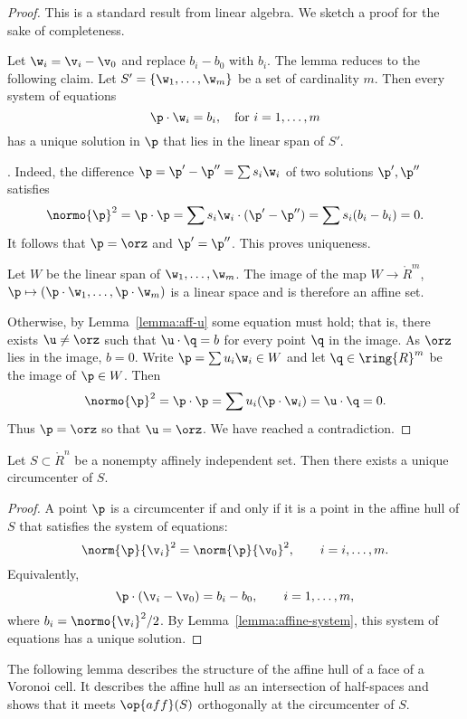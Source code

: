 \begin{proof} This is a standard result from linear algebra.
We sketch a proof for the sake of completeness.  

Let $\w_i = \v_i-\v_0$ and replace $b_i-b_0$ with $b_i$.  
The lemma reduces to the following claim.
Let $S' = \{\w_1,\ldots,\w_m\}$ be a  set
of cardinality $m$.  Then every system of equations
\[  
\p \cdot \w_i = b_i,\quad \text{for }i=1,\ldots,m
\] 
has a unique solution in $\p$ that lies in the linear span of $S'$.

. Indeed, the difference 
$\p = \p'-\p'' = \sum s_i \w_i$ of two solutions
$\p',\p''$ satisfies
\[  
\normo{\p}^2=\p\cdot\p = \sum s_i \w_i \cdot (\p' - \p'') =
\sum s_i (b_i-b_i)= 0.
\] 
It follows that $\p=\orz$ and $\p'=\p''$.  This proves uniqueness.

Let $W$ be the linear span of $\w_1,\ldots,\w_m$.  The image of the
map $W\to\ring{R}^m$, $\p\mapsto (\p\cdot\w_1,\ldots,\p\cdot\w_m)$ is
a linear space and is therefore an affine set.

Otherwise, by Lemma~\ref{lemma:aff-u} some equation must hold; that
is, there exists $\u\ne \orz$ such that $\u\cdot \q =b$ for every
point $\q$ in the image.  As $\orz$ lies in the image, $b=0$.  Write
$\p = \sum u_i \w_i\in W$ and let $\q\in\ring{R}^m$ be the image of
$\p\in W$.  Then
\[  
\normo{\p}^2 = \p\cdot\p = \sum u_i (\p \cdot \w_i) = \u\cdot \q = 0.
\]  
Thus $\p=\orz$ so that $\u=\orz$.  We have reached a contradiction.
\end{proof}

\begin{lemma} 
  Let $S\subset \ring{R}^n$ be a nonempty affinely independent set.
  Then there exists a unique circumcenter of $S$.
\end{lemma}

\begin{proof} 
  A point $\p$ is a circumcenter if and only if it is a point in the
  affine hull of $S$ that satisfies the system of equations:
\[  
\norm{\p}{\v_i}^2 = \norm{\p}{\v_0}^2,\qquad i = i,\ldots,m.
\] 
Equivalently,
\[  
\p\cdot (\v_i-\v_0) = b_i-b_0,\qquad i=1,\ldots,m,
\] 
where $b_i = \normo{\v_i}^2/2$.  By
Lemma~\ref{lemma:affine-system}, this system of equations has a unique
solution.
\end{proof}

The following lemma describes the structure of the affine hull of a
face of a Voronoi cell.  It describes the affine hull as an
intersection of half-spaces and shows that it meets $\op{aff}(S)$
orthogonally at the circumcenter of $S$.

